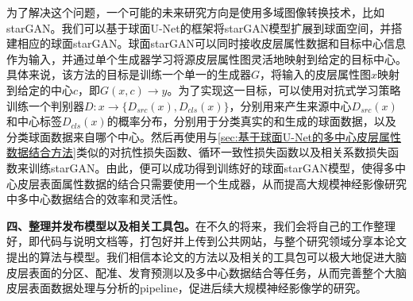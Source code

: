 为了解决这个问题，一个可能的未来研究方向是使用多域图像转换技术，比如starGAN\cite{choi2018stargan}。我们可以基于球面U-Net的框架将starGAN模型扩展到球面空间，并搭建相应的球面starGAN。球面starGAN可以同时接收皮层属性数据和目标中心信息作为输入，并通过单个生成器学习将源皮层属性图灵活地映射到给定的目标中心。具体来说，该方法的目标是训练一个单一的生成器$G$，将输入的皮层属性图$x$映射到给定的中心$c$，即$G(x,c)\rightarrow y$。为了实现这一目标，可以使用对抗式学习策略\cite{goodfellow2014generative}训练一个判别器$D:x\rightarrow \{D_{src}(x),D_{cls}(x)\}$，分别用来产生来源中心$D_{src}(x)$和中心标签$D_{cls}(x)$的概率分布，分别用于分类真实的和生成的球面数据，以及分类球面数据来自哪个中心。然后再使用与\ref{sec:基于球面U-Net的多中心皮层属性数据结合方法}类似的对抗性损失函数、循环一致性损失函数以及相关系数损失函数来训练starGAN。由此，便可以成功得到训练好的球面starGAN模型，使得多中心皮层表面属性数据的结合只需要使用一个生成器，从而提高大规模神经影像研究中多中心数据结合的效率和灵活性。

\textbf{四、整理并发布模型以及相关工具包。}在不久的将来，我们会将自己的工作整理好，即代码与说明文档等，打包好并上传到公共网站，与整个研究领域分享本论文提出的算法与模型。我们相信本论文的方法以及相关的工具包可以极大地促进大脑皮层表面的分区、配准、发育预测以及多中心数据结合等任务，从而完善整个大脑皮层表面数据处理与分析的pipeline，促进后续大规模神经影像学的研究。